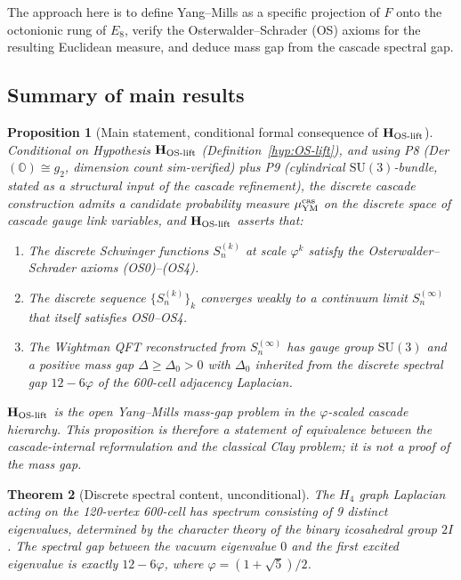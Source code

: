 \documentclass[11pt, a4paper]{amsart}
\newtheorem{theorem}{Theorem}[section]
\newtheorem{proposition}[theorem]{Proposition}
\theoremstyle{definition}
\begin{document}
The approach here is to define Yang--Mills as a specific projection
of $F$ onto the octonionic rung of $E_8$, verify the
Osterwalder--Schrader (OS) axioms for the resulting Euclidean measure,
and deduce mass gap from the cascade spectral gap.

\subsection{Summary of main results}

\begin{proposition}[Main statement, conditional formal consequence of $\mathbf{H_{\rm OS\text{-}lift}}$]\label{thm:main}
\emph{Conditional on Hypothesis $\mathbf{H_{\rm OS\text{-}lift}}$
(Definition~\ref{hyp:OS-lift}), and using P8 (Der$(\mathbb{O})\cong
g_2$, dimension count sim-verified) plus P9 (cylindrical
$\mathrm{SU}(3)$-bundle, stated as a structural input of the
cascade refinement)}, the discrete cascade construction admits a
candidate probability measure $\mu_{\mathrm{YM}}^{\rm cas}$ on the
discrete space of cascade gauge link variables, and
$\mathbf{H_{\rm OS\text{-}lift}}$ asserts that:
\begin{enumerate}
  \item The discrete Schwinger functions $S_n^{(k)}$ at scale
    $\varphi^k$ satisfy the Osterwalder--Schrader axioms
    (OS0)--(OS4).
  \item The discrete sequence $\{S_n^{(k)}\}_{k}$ converges weakly
    to a continuum limit $S_n^{(\infty)}$ that itself satisfies
    OS0--OS4.
  \item The Wightman QFT reconstructed from $S_n^{(\infty)}$ has
    gauge group $\mathrm{SU}(3)$ and a positive mass gap
    $\Delta \geq \Delta_0 > 0$ with $\Delta_0$ inherited from the
    discrete spectral gap $12 - 6\varphi$ of the 600-cell adjacency
    Laplacian.
\end{enumerate}

\emph{$\mathbf{H_{\rm OS\text{-}lift}}$ is the open Yang--Mills
mass-gap problem in the $\varphi$-scaled cascade hierarchy. This
proposition is therefore a statement of equivalence between the
cascade-internal reformulation and the classical Clay problem; it
is not a proof of the mass gap.}
\end{proposition}

\begin{theorem}[Discrete spectral content, unconditional]\label{thm:discrete-spectrum}
The $H_4$ graph Laplacian acting on the 120-vertex 600-cell has
spectrum consisting of 9 distinct eigenvalues, determined by the
character theory of the binary icosahedral group $2I$. The
spectral gap between the vacuum eigenvalue $0$ and the first
excited eigenvalue is exactly $12 - 6\varphi$, where
$\varphi = (1+\sqrt{5})/2$.
\end{theorem}
\end{document}
